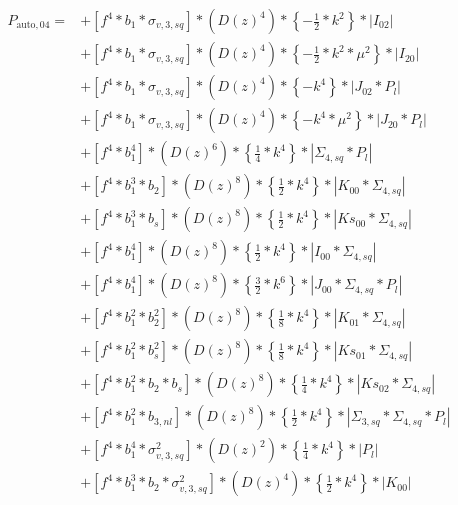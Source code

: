 \documentclass{article}
\begin{document}
\begin{equation}
\begin{aligned}  
P_{\mathrm{auto},04}=
&+\left[f^{4}*b_{1}*\sigma_{v,3,sq}\right]*\left(D(z)^{4}\right)*\left\{-\frac{1}{2}*k^{2}\right\}*\left|I_{02}\right| \\
&+\left[f^{4}*b_{1}*\sigma_{v,3,sq}\right]*\left(D(z)^{4}\right)*\left\{-\frac{1}{2}*k^{2}*\mu^{2}\right\}*\left|I_{20}\right| \\
&+\left[f^{4}*b_{1}*\sigma_{v,3,sq}\right]*\left(D(z)^{4}\right)*\left\{-k^{4}\right\}*\left|J_{02}*P_l\right| \\
&+\left[f^{4}*b_{1}*\sigma_{v,3,sq}\right]*\left(D(z)^{4}\right)*\left\{-k^{4}*\mu^{2}\right\}*\left|J_{20}*P_l\right| \\
&+\left[f^{4}*b_{1}^{4}\right]*\left(D(z)^{6}\right)*\left\{\frac{1}{4}*k^{4}\right\}*\left|\Sigma_{4,sq}*P_l\right| \\
&+\left[f^{4}*b_{1}^{3}*b_{2}\right]*\left(D(z)^{8}\right)*\left\{\frac{1}{2}*k^{4}\right\}*\left|K_{00}*\Sigma_{4,sq}\right| \\
&+\left[f^{4}*b_{1}^{3}*b_{s}\right]*\left(D(z)^{8}\right)*\left\{\frac{1}{2}*k^{4}\right\}*\left|Ks_{00}*\Sigma_{4,sq}\right| \\
&+\left[f^{4}*b_{1}^{4}\right]*\left(D(z)^{8}\right)*\left\{\frac{1}{2}*k^{4}\right\}*\left|I_{00}*\Sigma_{4,sq}\right| \\
&+\left[f^{4}*b_{1}^{4}\right]*\left(D(z)^{8}\right)*\left\{\frac{3}{2}*k^{6}\right\}*\left|J_{00}*\Sigma_{4,sq}*P_l\right| \\
&+\left[f^{4}*b_{1}^{2}*b_{2}^{2}\right]*\left(D(z)^{8}\right)*\left\{\frac{1}{8}*k^{4}\right\}*\left|K_{01}*\Sigma_{4,sq}\right| \\
&+\left[f^{4}*b_{1}^{2}*b_{s}^{2}\right]*\left(D(z)^{8}\right)*\left\{\frac{1}{8}*k^{4}\right\}*\left|Ks_{01}*\Sigma_{4,sq}\right| \\
&+\left[f^{4}*b_{1}^{2}*b_{2}*b_{s}\right]*\left(D(z)^{8}\right)*\left\{\frac{1}{4}*k^{4}\right\}*\left|Ks_{02}*\Sigma_{4,sq}\right| \\
&+\left[f^{4}*b_{1}^{2}*b_{3,nl}\right]*\left(D(z)^{8}\right)*\left\{\frac{1}{2}*k^{4}\right\}*\left|\Sigma_{3,sq}*\Sigma_{4,sq}*P_l\right| \\
&+\left[f^{4}*b_{1}^{4}*\sigma_{v,3,sq}^{2}\right]*\left(D(z)^{2}\right)*\left\{\frac{1}{4}*k^{4}\right\}*\left|P_l\right| \\
&+\left[f^{4}*b_{1}^{3}*b_{2}*\sigma_{v,3,sq}^{2}\right]*\left(D(z)^{4}\right)*\left\{\frac{1}{2}*k^{4}\right\}*\left|K_{00}\right| \\

\end{aligned}
\end{equation}
\end{document}
